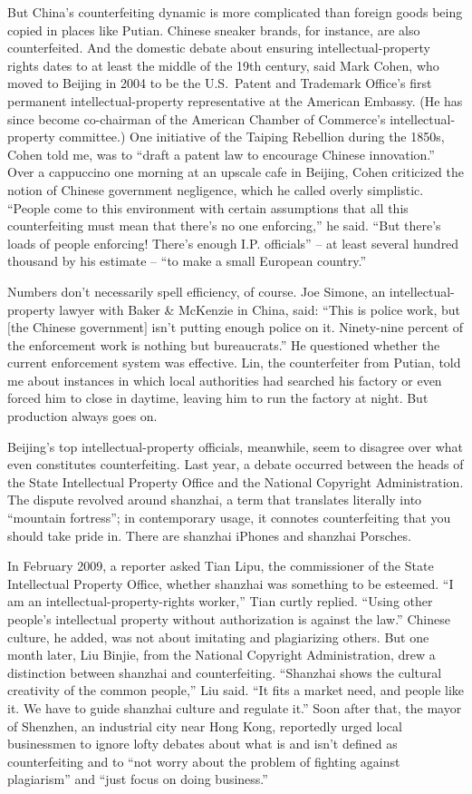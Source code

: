 ﻿\documentclass[12pt]{article}
\begin{document}
But China's counterfeiting dynamic is more complicated than foreign goods being copied in places
like Putian. Chinese sneaker brands, for instance, are also counterfeited. And the domestic debate
about ensuring intellectual-property rights dates to at least the middle of the 19th century, said
Mark Cohen, who moved to Beijing in 2004 to be the U.S.~Patent and Trademark Office's first
permanent intellectual-property representative at the American Embassy. (He has since become
co-chairman of the American Chamber of Commerce's intellectual-property committee.) One initiative
of the Taiping Rebellion during the 1850s, Cohen told me, was to ``draft a patent law to encourage
Chinese innovation.'' Over a cappuccino one morning at an upscale cafe in Beijing, Cohen criticized
the notion of Chinese government negligence, which he called overly simplistic. ``People come to
this environment with certain assumptions that all this counterfeiting must mean that there's no one
enforcing,'' he said. ``But there's loads of people enforcing! There's enough I.P. officials'' -- at
least several hundred thousand by his estimate -- ``to make a small European country.''

Numbers don't necessarily spell efficiency, of course. Joe Simone, an intellectual-property lawyer
with Baker \& McKenzie in China, said: ``This is police work, but $[$the Chinese government$]$ isn't
putting enough police on it. Ninety-nine percent of the enforcement work is nothing but
bureaucrats.'' He questioned whether the current enforcement system was effective. Lin, the
counterfeiter from Putian, told me about instances in which local authorities had searched his
factory or even forced him to close in daytime, leaving him to run the factory at night. But
production always goes on.

Beijing's top intellectual-property officials, meanwhile, seem to disagree over what even
constitutes counterfeiting. Last year, a debate occurred between the heads of the State Intellectual
Property Office and the National Copyright Administration. The dispute revolved around shanzhai, a
term that translates literally into ``mountain fortress''; in contemporary usage, it connotes
counterfeiting that you should take pride in. There are shanzhai iPhones and shanzhai Porsches.

In February 2009, a reporter asked Tian Lipu, the commissioner of the State Intellectual Property
Office, whether shanzhai was something to be esteemed. ``I am an intellectual-property-rights
worker,'' Tian curtly replied. ``Using other people's intellectual property without authorization is
against the law.'' Chinese culture, he added, was not about imitating and plagiarizing others. But
one month later, Liu Binjie, from the National Copyright Administration, drew a distinction between
shanzhai and counterfeiting. ``Shanzhai shows the cultural creativity of the common people,'' Liu
said. ``It fits a market need, and people like it. We have to guide shanzhai culture and regulate
it.'' Soon after that, the mayor of Shenzhen, an industrial city near Hong Kong, reportedly urged
local businessmen to ignore lofty debates about what is and isn't defined as counterfeiting and to
``not worry about the problem of fighting against plagiarism'' and ``just focus on doing business.''
\end{document}

